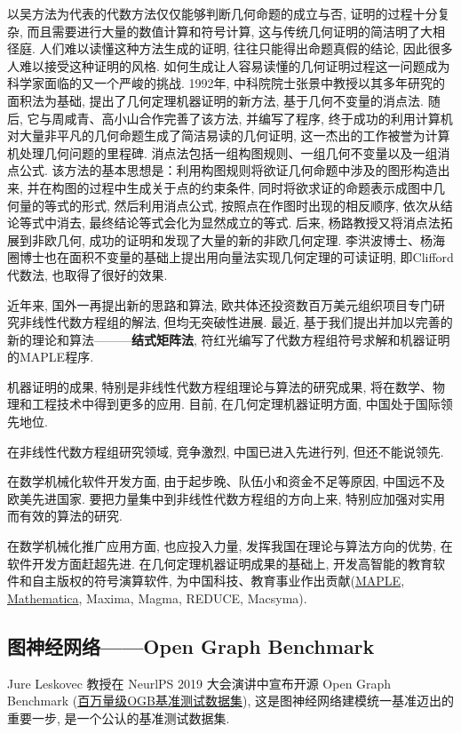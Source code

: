 以吴方法为代表的代数方法仅仅能够判断几何命题的成立与否, 证明的过程十分复杂, 而且需要进行大量的数值计算和符号计算, 这与传统几何证明的简洁明了大相径庭. 人们难以读懂这种方法生成的证明, 往往只能得出命题真假的结论, 因此很多人难以接受这种证明的风格. 如何生成让人容易读懂的几何证明过程这一问题成为科学家面临的又一个严峻的挑战.  1992年, 中科院院士张景中教授以其多年研究的面积法为基础, 提出了几何定理机器证明的新方法, 基于几何不变量的消点法. 随后, 它与周咸青、高小山合作完善了该方法, 并编写了程序, 终于成功的利用计算机对大量非平凡的几何命题生成了简洁易读的几何证明, 这一杰出的工作被誉为计算机处理几何问题的里程碑.  消点法包括一组构图规则、一组几何不变量以及一组消点公式. 该方法的基本思想是：利用构图规则将欲证几何命题中涉及的图形构造出来, 并在构图的过程中生成关于点的约束条件, 同时将欲求证的命题表示成图中几何量的等式的形式, 然后利用消点公式, 按照点在作图时出现的相反顺序, 依次从结论等式中消去, 最终结论等式会化为显然成立的等式. 后来, 杨路教授又将消点法拓展到非欧几何, 成功的证明和发现了大量的新的非欧几何定理. 李洪波博士、杨海圈博士也在面积不变量的基础上提出用向量法实现几何定理的可读证明, 即Clifford代数法, 也取得了很好的效果.

近年来, 国外一再提出新的思路和算法, 欧共体还投资数百万美元组织项目专门研究非线性代数方程组的解法, 但均无突破性进展. 最近, 基于我们提出并加以完善的新的理论和算法———\textbf{结式矩阵法}, 符红光编写了代数方程组符号求解和机器证明的MAPLE程序.  

机器证明的成果, 特别是非线性代数方程组理论与算法的研究成果, 将在数学、物理和工程技术中得到更多的应用. 目前, 在几何定理机器证明方面, 中国处于国际领先地位.

在非线性代数方程组研究领域, 竞争激烈, 中国已进入先进行列, 但还不能说领先.

在数学机械化软件开发方面, 由于起步晚、队伍小和资金不足等原因, 中国远不及欧美先进国家. 要把力量集中到非线性代数方程组的方向上来, 特别应加强对实用而有效的算法的研究.

在数学机械化推广应用方面, 也应投入力量, 发挥我国在理论与算法方向的优势, 在软件开发方面赶超先进. 在几何定理机器证明成果的基础上, 开发高智能的教育软件和自主版权的符号演算软件, 为中国科技、教育事业作出贡献(\href{https://www.maplesoft.com.cn/}{MAPLE},
\href{https://www.wolfram.com/}{Mathematica}, Maxima, Magma, REDUCE, Macsyma).
\subsection{图神经网络——Open Graph Benchmark}
Jure Leskovec 教授在 NeurlPS 2019 大会演讲中宣布开源 Open Graph Benchmark (\href{http://ogb.stanford.edu}{百万量级OGB基准测试数据集}), 这是图神经网络建模统一基准迈出的重要一步, 是一个公认的基准测试数据集.

